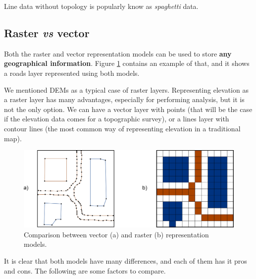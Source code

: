 Line data without topology is popularly know as \emph{spaghetti} data.


\subsection{Raster \emph{vs} vector}


Both the raster and vector representation models can be used to store \textbf{any geographical information}. Figure \ref{Fig:Representation_models} contains an example of that, and it shows a roads layer represented using both models. 

We mentioned DEMs as a typical case of raster layers. Representing elevation as a raster layer has many advantages, especially for performing analysis, but it is not the only option. We can have a vector layer with points (that will be the case if the elevation data comes for a topographic survey), or a lines layer with contour lines (the most common way of representing elevation in a traditional map).

\begin{figure}[!hbt]   
\centering
\includegraphics[width=\textwidth]{Data/Representation_models.pdf}
\caption{\small Comparison between vector (a) and raster (b) representation models.}
\label{Fig:Representation_models} 
\end{figure}

It is clear that both models have many differences, and each of them has it pros and cons. The following are some factors to compare.



